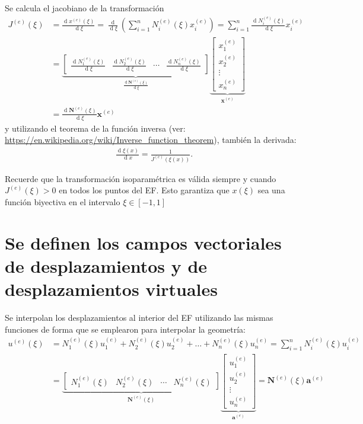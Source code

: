 \documentclass[12pt,letterpaper]{article}
\newcommand{\ve}[1]{{\boldsymbol{#1}}}
\newcommand{\ma}[1]{{\boldsymbol{#1}}}
\newcommand{\dd}{\operatorname{d} \!}
\begin{document}
Se calcula el jacobiano de la transformación
\begin{align}
J^{(e)}(\xi) &= \frac{\dd x^{(e)}(\xi)}{\dd \xi} = 
\frac{\dd}{\dd \xi}\left(\sum_{i=1}^n N_i^{(e)}(\xi) x_i^{(e)}\right) = \sum_{i=1}^n \frac{\dd N_i^{(e)}(\xi)}{\dd \xi} x_i^{(e)} \\
&= 
\underbrace{\begin{bmatrix}
    \frac{\dd N_1^{(e)}(\xi)}{\dd \xi} & \frac{\dd N_2^{(e)}(\xi)}{\dd \xi} & \cdots & \frac{\dd N_n^{(e)}(\xi)}{\dd \xi}
    \end{bmatrix}}_{\frac{\dd \ma{N}^{(e)}(\xi)}{\dd \xi}}
\underbrace{\begin{bmatrix}
    x_1^{(e)} \\ x_2^{(e)} \\ \vdots \\ x_n^{(e)}
    \end{bmatrix}}_{\ma{x}^{(e)}} \\
&= \frac{\dd \ma{N}^{(e)}(\xi)}{\dd \xi}  \ve{x}^{(e)}
\end{align}
y utilizando el teorema de la función inversa (ver: \url{https://en.wikipedia.org/wiki/Inverse_function_theorem}), también la derivada:
\begin{align}
\frac{\dd \xi(x)}{\dd x} = \frac{1}{J^{(e)}(\xi(x))}.
\end{align}


Recuerde que la transformación isoparamétrica es válida siempre y cuando $J^{(e)}(\xi)>0$ en todos los puntos del EF. Esto garantiza que $x(\xi)$ sea una función biyectiva en el intervalo $\xi\in[-1,1]$



\newpage

\section{Se definen los campos vectoriales de desplazamientos y  de desplazamientos virtuales}
Se interpolan los desplazamientos al interior del EF utilizando las mismas funciones de forma que se emplearon para interpolar la geometría:
\begin{align}
u^{(e)}(\xi) 
&= N_1^{(e)}(\xi) u_1^{(e)} + N_2^{(e)}(\xi) u_2^{(e)} + \ldots + N_n^{(e)}(\xi) u_n^{(e)} 
= \sum_{i=1}^n N_i^{(e)}(\xi) u_i^{(e)} \\
&= 
\underbrace{\begin{bmatrix}
N_1^{(e)}(\xi) & N_2^{(e)}(\xi) & \cdots & N_n^{(e)}(\xi)
\end{bmatrix}}_{\ma{N}^{(e)}(\xi)}
\underbrace{\begin{bmatrix}
   u_1^{(e)} \\ u_2^{(e)} \\ \vdots \\ u_n^{(e)}
   \end{bmatrix}}_{\ma{a}^{(e)}} = \ma{N}^{(e)}(\xi)  \ve{a}^{(e)}
\end{align}
\end{document}
